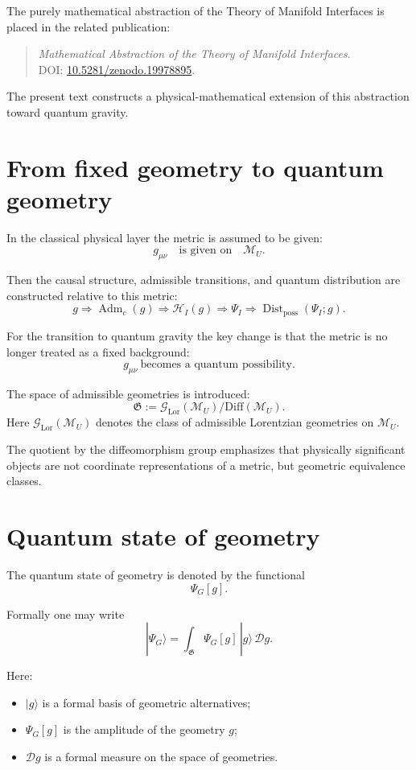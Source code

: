 \documentclass[12pt,a4paper]{article}
\DeclareMathOperator{\Adm}{Adm}
\DeclareMathOperator{\Dist}{Dist}
\newcommand{\M}{\mathcal M_U}
\newcommand{\Gspace}{\mathfrak G}
\newcommand{\Hilb}{\mathcal H}
\newcommand{\D}{\mathcal D}
\begin{document}
The purely mathematical abstraction of the Theory of Manifold Interfaces is placed in the related publication:
\begin{quote}
\textit{Mathematical Abstraction of the Theory of Manifold Interfaces}.\\
DOI: \href{https://doi.org/10.5281/zenodo.19978895}{10.5281/zenodo.19978895}.
\end{quote}

The present text constructs a physical-mathematical extension of this abstraction toward quantum gravity.

\section{From fixed geometry to quantum geometry}

In the classical physical layer the metric is assumed to be given:
\[
g_{\mu\nu}\quad \text{is given on}\quad \M.
\]

Then the causal structure, admissible transitions, and quantum distribution are constructed relative to this metric:
\[
g
\Rightarrow
\Adm_c(g)
\Rightarrow
\Hilb_I(g)
\Rightarrow
\Psi_I
\Rightarrow
\Dist_{\mathrm{poss}}(\Psi_I;g).
\]

For the transition to quantum gravity the key change is that the metric is no longer treated as a fixed background:
\[
\boxed{g_{\mu\nu}\ \text{becomes a quantum possibility}.}
\]

The space of admissible geometries is introduced:
\[
\boxed{
\Gspace:=\mathcal G_{\mathrm{Lor}}(\M)/\mathrm{Diff}(\M).
}
\]
Here $\mathcal G_{\mathrm{Lor}}(\M)$ denotes the class of admissible Lorentzian geometries on $\M$.

The quotient by the diffeomorphism group emphasizes that physically significant objects are not coordinate representations of a metric, but geometric equivalence classes.

\section{Quantum state of geometry}

The quantum state of geometry is denoted by the functional
\[
\Psi_G[g].
\]

Formally one may write
\[
\boxed{
|\Psi_G\rangle
=
\int_{\Gspace}
\Psi_G[g]\,|g\rangle\,\D g.
}
\]

Here:
\begin{itemize}[leftmargin=2em]
    \item $|g\rangle$ is a formal basis of geometric alternatives;
    \item $\Psi_G[g]$ is the amplitude of the geometry $g$;
    \item $\D g$ is a formal measure on the space of geometries.
\end{itemize}
\end{document}
